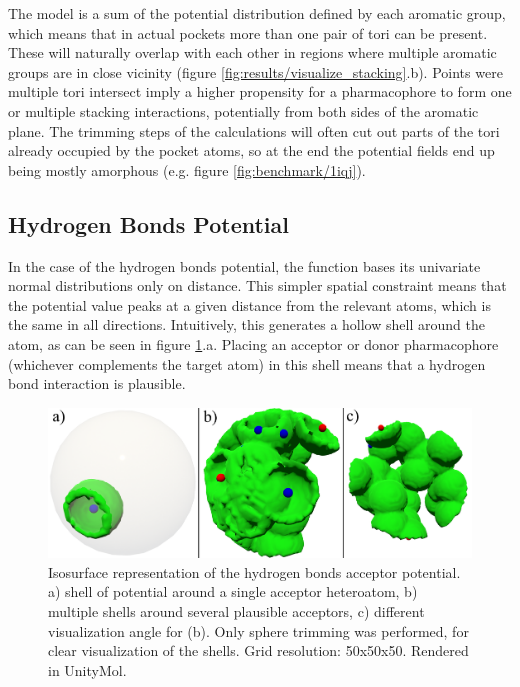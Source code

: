       The model is a sum of the potential distribution defined by each aromatic group, which means that in actual pockets more than one pair of tori can be present. These will naturally overlap with each other in regions where multiple aromatic groups are in close vicinity (figure \ref{fig:results/visualize_stacking}.b). Points were multiple tori intersect imply a higher propensity for a pharmacophore to form one or multiple stacking interactions, potentially from both sides of the aromatic plane. The trimming steps of the calculations will often cut out parts of the tori already occupied by the pocket atoms, so at the end the potential fields end up being mostly amorphous (e.g. figure \ref{fig:benchmark/1iqj}).

  \subsection{Hydrogen Bonds Potential}
    In the case of the hydrogen bonds potential, the function bases its univariate normal distributions only on distance. This simpler spatial constraint means that the potential value peaks at a given distance from the relevant atoms, which is the same in all directions. Intuitively, this generates a hollow shell around the atom, as can be seen in figure \ref{fig:results/visualize_hbonds}.a. Placing an acceptor or donor pharmacophore (whichever complements the target atom) in this shell means that a hydrogen bond interaction is plausible.

    \begin{figure}[H]
      \centering
      \includegraphics[width=1\textwidth]{figures/results/visualize_hbonds.png}
      \caption{\label{fig:results/visualize_hbonds} Isosurface representation of the hydrogen bonds acceptor potential. a) shell of potential around a single acceptor heteroatom, b) multiple shells around several plausible acceptors, c) different visualization angle for (b). Only sphere trimming was performed, for clear visualization of the shells. Grid resolution: 50x50x50. Rendered in UnityMol.}
    \end{figure}

